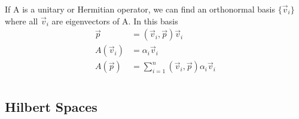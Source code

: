 \documentclass[cplx.tex]{subfiles}
\begin{document}
If A is a unitary or Hermitian operator, we can find an orthonormal basis $\{\vec{v}_i\}$ where all $\vec{v}_i$ are eigenvectors of A.
In this basis
\begin{align}
    \vec{p} &= (\vec{v}_i,\vec{p})\vec{v}_i \\
    A(\vec{v}_i) &= \alpha_i\vec{v}_i \\
    A(\vec{p}) &= \sum_{i=1}^n (\vec{v}_i,\vec{p})\alpha_i\vec{v}_i
\end{align}

\chapter{}
\section{Hilbert Spaces}
\end{document}
